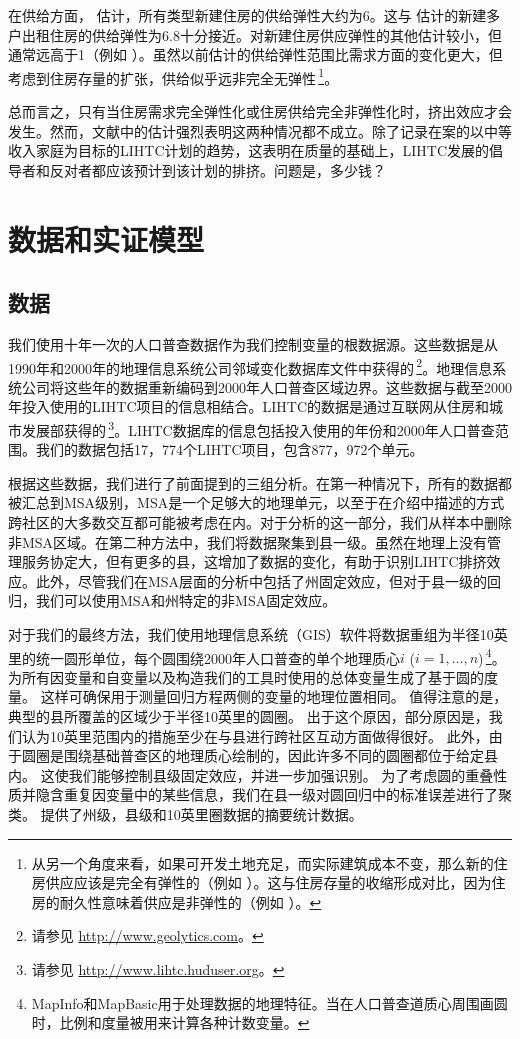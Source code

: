 \documentclass[lang=cn,11pt,a4paper]{paper}
\begin{document}
在供给方面，\cite{Mayer200085} 估计，所有类型新建住房的供给弹性大约为6。这与 \cite{DiPasquale1992337} 估计的新建多户出租住房的供给弹性为6.8十分接近。对新建住房供应弹性的其他估计较小，但通常远高于1（例如 \citep{DiPasquale1992337,Rosen19791}）。虽然以前估计的供给弹性范围比需求方面的变化更大，但考虑到住房存量的扩张，供给似乎远非完全无弹性\,\footnote{从另一个角度来看，如果可开发土地充足，而实际建筑成本不变，那么新的住房供应应该是完全有弹性的（例如 \citep{Rosenthal1994182}）。这与住房存量的收缩形成对比，因为住房的耐久性意味着供应是非弹性的（例如 \citep{Glaeser2005345}）。}。

总而言之，只有当住房需求完全弹性化或住房供给完全非弹性化时，挤出效应才会发生。然而，文献中的估计强烈表明这两种情况都不成立。除了记录在案的以中等收入家庭为目标的LIHTC计划的趋势，这表明在质量的基础上，LIHTC发展的倡导者和反对者都应该预计到该计划的排挤。问题是，多少钱？

\section{数据和实证模型}\label{sec4}

\subsection{数据}

我们使用十年一次的人口普查数据作为我们控制变量的根数据源。这些数据是从1990年和2000年的地理信息系统公司邻域变化数据库文件中获得的\,\footnote{请参见 \url{http://www.geolytics.com}。}。地理信息系统公司将这些年的数据重新编码到2000年人口普查区域边界。这些数据与截至2000年投入使用的LIHTC项目的信息相结合。LIHTC的数据是通过互联网从住房和城市发展部获得的\,\footnote{请参见 \url{http://www.lihtc.huduser.org}。}。LIHTC数据库的信息包括投入使用的年份和2000年人口普查范围。我们的数据包括17，774个LIHTC项目，包含877，972个单元。

根据这些数据，我们进行了前面提到的三组分析。在第一种情况下，所有的数据都被汇总到MSA级别，MSA是一个足够大的地理单元，以至于在介绍中描述的方式跨社区的大多数交互都可能被考虑在内。对于分析的这一部分，我们从样本中删除非MSA区域。在第二种方法中，我们将数据聚集到县一级。虽然在地理上没有管理服务协定大，但有更多的县，这增加了数据的变化，有助于识别LIHTC排挤效应。此外，尽管我们在MSA层面的分析中包括了州固定效应，但对于县一级的回归，我们可以使用MSA和州特定的非MSA固定效应。

对于我们的最终方法，我们使用地理信息系统（GIS）软件将数据重组为半径10英里的统一圆形单位，每个圆围绕2000年人口普查的单个地理质心$i$ ($i = 1, \dots,n$)\,\footnote{MapInfo和MapBasic用于处理数据的地理特征。当在人口普查道质心周围画圆时，比例和度量被用来计算各种计数变量。}。为所有因变量和自变量以及构造我们的工具时使用的总体变量生成了基于圆的度量。 这样可确保用于测量回归方程两侧的变量的地理位置相同。 值得注意的是，典型的县所覆盖的区域少于半径10英里的圆圈。 出于这个原因，部分原因是，我们认为10英里范围内的措施至少在与县进行跨社区互动方面做得很好。 此外，由于圆圈是围绕基础普查区的地理质心绘制的，因此许多不同的圆圈都位于给定县内。 这使我们能够控制县级固定效应，并进一步加强识别。 为了考虑圆的重叠性质并隐含重复因变量中的某些信息，我们在县一级对圆回归中的标准误差进行了聚类。 提供了州级，县级和10英里圈数据的摘要统计数据。
\end{document}
